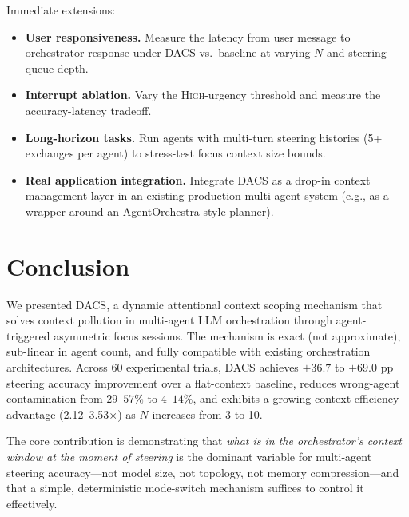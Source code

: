 \documentclass{article}
\begin{document}
Immediate extensions:
\begin{itemize}
  \item \textbf{User responsiveness.} Measure the latency from user
  message to orchestrator response under DACS vs.\ baseline at varying
  $N$ and steering queue depth.
  \item \textbf{Interrupt ablation.} Vary the \textsc{High}-urgency
  threshold and measure the accuracy-latency tradeoff.
  \item \textbf{Long-horizon tasks.} Run agents with multi-turn steering
  histories (5+ exchanges per agent) to stress-test focus context size
  bounds.
  \item \textbf{Real application integration.} Integrate DACS as a
  drop-in context management layer in an existing production multi-agent
  system (e.g., as a wrapper around an AgentOrchestra-style planner).
\end{itemize}

\section{Conclusion}
\label{sec:conclusion}

We presented DACS, a dynamic attentional context scoping mechanism that
solves context pollution in multi-agent LLM orchestration through
agent-triggered asymmetric focus sessions.
The mechanism is exact (not approximate), sub-linear in agent count, and
fully compatible with existing orchestration architectures.
Across 60 experimental trials, DACS achieves $+36.7$ to $+69.0$ pp
steering accuracy improvement over a flat-context baseline, reduces
wrong-agent contamination from $29$--$57\%$ to $4$--$14\%$, and
exhibits a growing context efficiency advantage (2.12--3.53$\times$) as
$N$ increases from 3 to 10.

The core contribution is demonstrating that \emph{what is in the
orchestrator's context window at the moment of steering} is the
dominant variable for multi-agent steering accuracy—not model size,
not topology, not memory compression—and that a simple, deterministic
mode-switch mechanism suffices to control it effectively.



\end{document}
